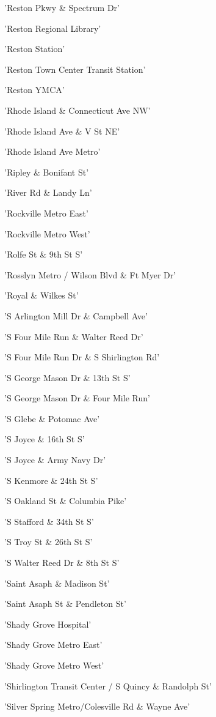 \documentclass[11pt]{article}
\begin{document}
\begin{enumerate*}
\item 'Reston Pkwy \& Spectrum Dr'
\item 'Reston Regional Library'
\item 'Reston Station'
\item 'Reston Town Center Transit Station'
\item 'Reston YMCA'
\item 'Rhode Island \& Connecticut Ave NW'
\item 'Rhode Island Ave \& V St NE'
\item 'Rhode Island Ave Metro'
\item 'Ripley \& Bonifant St'
\item 'River Rd \& Landy Ln'
\item 'Rockville Metro East'
\item 'Rockville Metro West'
\item 'Rolfe St \& 9th St S'
\item 'Rosslyn Metro / Wilson Blvd \& Ft Myer Dr'
\item 'Royal \& Wilkes St'
\item 'S Arlington Mill Dr \& Campbell Ave'
\item 'S Four Mile Run \& Walter Reed Dr'
\item 'S Four Mile Run Dr \& S Shirlington Rd'
\item 'S George Mason Dr \& 13th St S'
\item 'S George Mason Dr \& Four Mile Run'
\item 'S Glebe \& Potomac Ave'
\item 'S Joyce \& 16th St S'
\item 'S Joyce \& Army Navy Dr'
\item 'S Kenmore \& 24th St S'
\item 'S Oakland St \& Columbia Pike'
\item 'S Stafford \& 34th St S'
\item 'S Troy St \& 26th St S'
\item 'S Walter Reed Dr \& 8th St S'
\item 'Saint Asaph \& Madison St'
\item 'Saint Asaph St \& Pendleton  St'
\item 'Shady Grove Hospital'
\item 'Shady Grove Metro East'
\item 'Shady Grove Metro West'
\item 'Shirlington Transit Center / S Quincy \& Randolph St'
\item 'Silver Spring Metro/Colesville Rd \& Wayne Ave'

\end{enumerate*}
\end{document}
